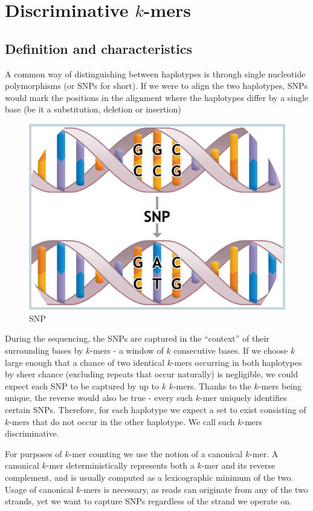 \chapter{Discriminative $k$-mers}

\section{Definition and characteristics}

A common way of distinguishing between haplotypes is through single nucleotide polymorphisms (or SNPs for short)\cite{snp}. If we were to align the two haplotypes, SNPs would mark the positions in the alignment where the haplotypes differ by a single base (be it a substitution, deletion or insertion)

\begin{figure}
\includegraphics[width=200bp]{figures/snps.jpg}
\caption{SNP\cite{snp_img}}
\label{fig:k_too_low}
\end{figure}

During the sequencing, the SNPs are captured in the “context” of their surrounding bases by $k$-mers - a window of $k$ consecutive bases. If we choose $k$ large enough that a chance of two identical $k$-mers occurring in both haplotypes by sheer chance (excluding repeats that occur naturally) is negligible, we could expect each SNP to be captured by up to $k$ $k$-mers. Thanks to the $k$-mers being unique, the reverse would also be true - every such $k$-mer uniquely identifies certain SNPs. Therefore, for each haplotype we expect a set to exist consisting of $k$-mers that do not occur in the other haplotype. We call such $k$-mers discriminative.

For purposes of $k$-mer counting we use the notion of a canonical $k$-mer. A canonical $k$-mer deterministically represents both a $k$-mer and its reverse complement, and is usually computed as a lexicographic minimum of the two. Usage of canonical $k$-mers is necessary, as reads can originate from any of the two strands, yet we want to capture SNPs regardless of the strand we operate on.

